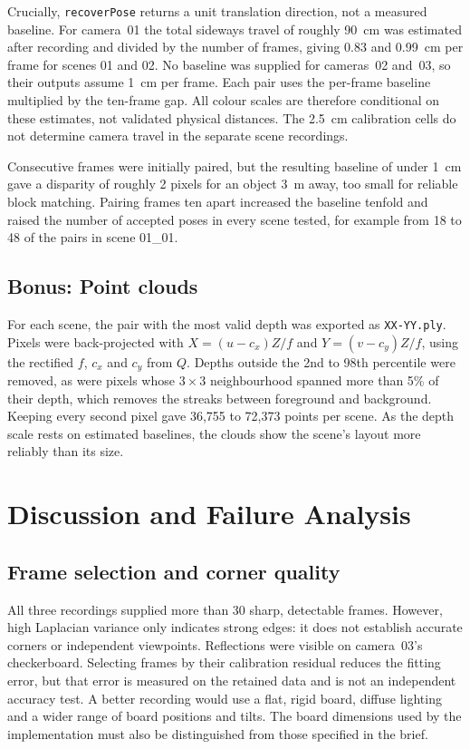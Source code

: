 \documentclass[conference]{IEEEtran}
\begin{document}
Crucially, \texttt{recoverPose} returns a unit translation direction, not a measured baseline. For camera~01 the total sideways travel of roughly 90~cm was estimated after recording and divided by the number of frames, giving 0.83 and 0.99~cm per frame for scenes 01 and 02. No baseline was supplied for cameras~02 and~03, so their outputs assume 1~cm per frame. Each pair uses the per-frame baseline multiplied by the ten-frame gap. All colour scales are therefore conditional on these estimates, not validated physical distances. The 2.5~cm calibration cells do not determine camera travel in the separate scene recordings.

Consecutive frames were initially paired, but the resulting baseline of under 1~cm gave a disparity of roughly 2 pixels for an object 3~m away, too small for reliable block matching. Pairing frames ten apart increased the baseline tenfold and raised the number of accepted poses in every scene tested, for example from 18 to 48 of the pairs in scene 01\_01.

\subsection{Bonus: Point clouds}
For each scene, the pair with the most valid depth was exported as \texttt{XX-YY.ply}. Pixels were back-projected with $X=(u-c_x)Z/f$ and $Y=(v-c_y)Z/f$, using the rectified $f$, $c_x$ and $c_y$ from $Q$. Depths outside the 2nd to 98th percentile were removed, as were pixels whose $3\times3$ neighbourhood spanned more than 5\% of their depth, which removes the streaks between foreground and background. Keeping every second pixel gave 36,755 to 72,373 points per scene. As the depth scale rests on estimated baselines, the clouds show the scene's layout more reliably than its size.

\section{Discussion and Failure Analysis}
\subsection{Frame selection and corner quality}
All three recordings supplied more than 30 sharp, detectable frames. However, high Laplacian variance only indicates strong edges: it does not establish accurate corners or independent viewpoints. Reflections were visible on camera~03's checkerboard. Selecting frames by their calibration residual reduces the fitting error, but that error is measured on the retained data and is not an independent accuracy test. A better recording would use a flat, rigid board, diffuse lighting and a wider range of board positions and tilts. The board dimensions used by the implementation must also be distinguished from those specified in the brief.
\end{document}
